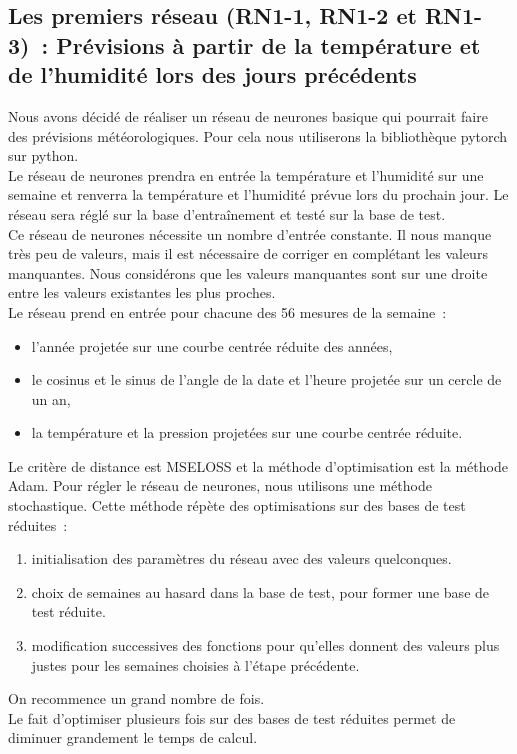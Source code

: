 \documentclass[11pt,a4paper]{article}
\begin{document}
\subsection {Les premiers réseau (RN1-1, RN1-2 et RN1-3)~: Prévisions à partir de la température et de l'humidité lors des jours précédents}
Nous avons décidé de réaliser un réseau de neurones basique qui pourrait faire des prévisions météorologiques. Pour cela nous utiliserons la bibliothèque pytorch sur python.\\
Le réseau de neurones prendra en entrée la température et l'humidité sur une semaine et renverra la température et l'humidité prévue lors du prochain jour. Le réseau sera réglé sur la base d'entraînement et testé sur la base de test.\\
Ce réseau de neurones nécessite un nombre d'entrée constante. Il nous manque très peu de valeurs, mais il est nécessaire de corriger en complétant les valeurs manquantes. Nous considérons que les valeurs manquantes sont sur une droite entre les valeurs existantes les plus proches.\\
Le réseau prend en entrée pour chacune des 56 mesures de la semaine~: 
\begin{itemize}
\item  l'année projetée sur une courbe centrée réduite des années,
\item  le cosinus et le sinus de l'angle de la date et l'heure projetée sur un cercle de un an,
\item  la température et la pression projetées sur une courbe centrée réduite. 
\end{itemize}
Le critère de distance est MSELOSS et la méthode d'optimisation est la méthode Adam.
Pour régler le réseau de neurones, nous utilisons une méthode stochastique. Cette méthode répète des optimisations sur des bases de test réduites~:
\begin{enumerate}
\item initialisation des paramètres du réseau avec des valeurs quelconques.
\item choix de semaines au hasard dans la base de test, pour former une base de test réduite.  
\item modification successives des fonctions pour qu'elles donnent des valeurs plus justes pour les semaines choisies à l'étape précédente. 
\end{enumerate}
On recommence un grand nombre de fois. \\
Le fait d'optimiser plusieurs fois sur des bases de test réduites permet de diminuer grandement le temps de calcul.\\
\end{document}
